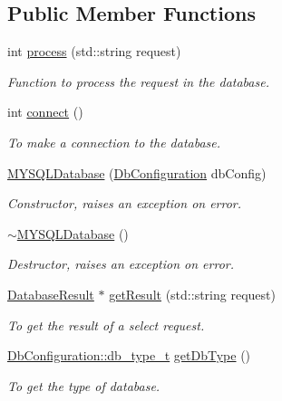 \subsection*{Public Member Functions}
\begin{DoxyCompactItemize}
\item 
int \hyperlink{classMYSQLDatabase_ae43c4557f43b775f26817082f4913d81}{process} (std::string request)
\begin{DoxyCompactList}\small\item\em Function to process the request in the database. \item\end{DoxyCompactList}\item 
int \hyperlink{classMYSQLDatabase_a3e0dc34a2b20ff76e5fa39cbe340c5d7}{connect} ()
\begin{DoxyCompactList}\small\item\em To make a connection to the database. \item\end{DoxyCompactList}\item 
\hyperlink{classMYSQLDatabase_a69cca4aa62adf08b995908aec1451522}{MYSQLDatabase} (\hyperlink{classDbConfiguration}{DbConfiguration} dbConfig)
\begin{DoxyCompactList}\small\item\em Constructor, raises an exception on error. \item\end{DoxyCompactList}\item 
\hypertarget{classMYSQLDatabase_a5337e67330a1ffa3413a3e9725f1f1c0}{
\hyperlink{classMYSQLDatabase_a5337e67330a1ffa3413a3e9725f1f1c0}{$\sim$MYSQLDatabase} ()}
\label{classMYSQLDatabase_a5337e67330a1ffa3413a3e9725f1f1c0}

\begin{DoxyCompactList}\small\item\em Destructor, raises an exception on error. \item\end{DoxyCompactList}\item 
\hyperlink{classDatabaseResult}{DatabaseResult} $\ast$ \hyperlink{classMYSQLDatabase_a4e3804ff11f44b3e5770932c8351ea92}{getResult} (std::string request)
\begin{DoxyCompactList}\small\item\em To get the result of a select request. \item\end{DoxyCompactList}\item 
\hyperlink{classDbConfiguration_a4a57e43a5017a5c4833a784a994c91cf}{DbConfiguration::db\_\-type\_\-t} \hyperlink{classMYSQLDatabase_a6002562a486bc8a4c5a820cf45a62e64}{getDbType} ()
\begin{DoxyCompactList}\small\item\em To get the type of database. \item\end{DoxyCompactList}\end{DoxyCompactItemize}
